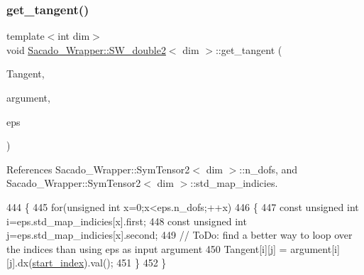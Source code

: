 \subsubsection{\texorpdfstring{get\+\_\+tangent()}{get\_tangent()}\hspace{0.1cm}{\footnotesize\ttfamily [2/2]}}
{\footnotesize\ttfamily template$<$int dim$>$ \\
void \hyperlink{classSacado__Wrapper_1_1SW__double2}{Sacado\+\_\+\+Wrapper\+::\+S\+W\+\_\+double2}$<$ dim $>$\+::get\+\_\+tangent (\begin{DoxyParamCaption}\item[{Symmetric\+Tensor$<$ 2, dim $>$ \&}]{Tangent,  }\item[{Symmetric\+Tensor$<$ 2, dim, Sacado\+::\+Fad\+::\+D\+Fad$<$ \hyperlink{Sacado__Wrapper_8h_a7e0893207b87dad05c66a34baac8ed2e}{D\+Fad\+Type} $>$ $>$ \&}]{argument,  }\item[{\hyperlink{classSacado__Wrapper_1_1SymTensor2}{Sym\+Tensor2}$<$ dim $>$ \&}]{eps }\end{DoxyParamCaption})}



References Sacado\+\_\+\+Wrapper\+::\+Sym\+Tensor2$<$ dim $>$\+::n\+\_\+dofs, and Sacado\+\_\+\+Wrapper\+::\+Sym\+Tensor2$<$ dim $>$\+::std\+\_\+map\+\_\+indicies.


\begin{DoxyCode}
444     \{
445         \textcolor{keywordflow}{for}(\textcolor{keywordtype}{unsigned} \textcolor{keywordtype}{int} x=0;x<eps.n\_dofs;++x)
446         \{
447             \textcolor{keyword}{const} \textcolor{keywordtype}{unsigned} \textcolor{keywordtype}{int} i=eps.std\_map\_indicies[x].first;
448             \textcolor{keyword}{const} \textcolor{keywordtype}{unsigned} \textcolor{keywordtype}{int} j=eps.std\_map\_indicies[x].second;
449             \textcolor{comment}{// ToDo: find a better way to loop over the indices than using eps as input argument}
450             Tangent[i][j] = argument[i][j].dx(\hyperlink{classSacado__Wrapper_1_1SW__double2_ae7327540ad1fd725ea78ffc2268b423a}{start\_index}).val();
451         \}
452     \}
\end{DoxyCode}
\mbox{\label{classSacado__Wrapper_1_1SW__double2_af633ef0195198f1fed2bb44106af33c5}} 
